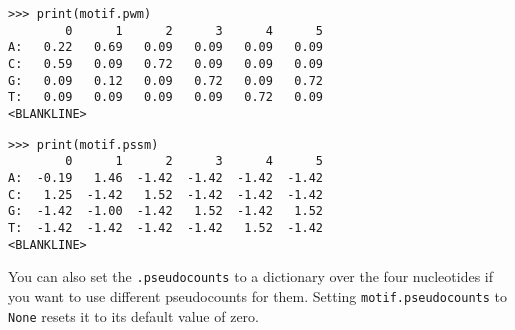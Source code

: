 \begin{verbatim}
>>> print(motif.pwm)
        0      1      2      3      4      5
A:   0.22   0.69   0.09   0.09   0.09   0.09
C:   0.59   0.09   0.72   0.09   0.09   0.09
G:   0.09   0.12   0.09   0.72   0.09   0.72
T:   0.09   0.09   0.09   0.09   0.72   0.09
<BLANKLINE>
\end{verbatim}
\begin{verbatim}
>>> print(motif.pssm)
        0      1      2      3      4      5
A:  -0.19   1.46  -1.42  -1.42  -1.42  -1.42
C:   1.25  -1.42   1.52  -1.42  -1.42  -1.42
G:  -1.42  -1.00  -1.42   1.52  -1.42   1.52
T:  -1.42  -1.42  -1.42  -1.42   1.52  -1.42
<BLANKLINE>
\end{verbatim}
You can also set the \verb+.pseudocounts+ to a dictionary over the four nucleotides if you want to use different pseudocounts for them. Setting \verb+motif.pseudocounts+ to \verb+None+ resets it to its default value of zero.

